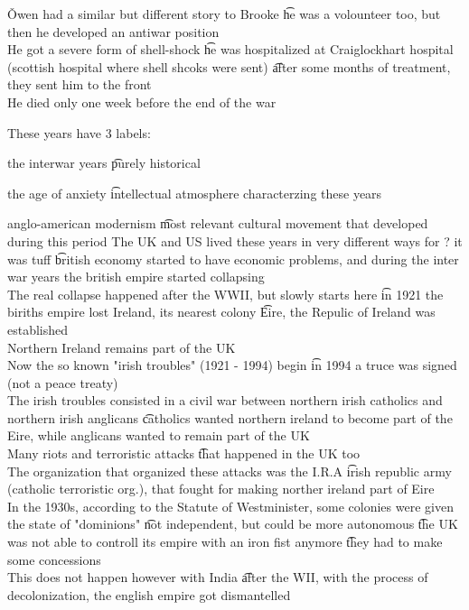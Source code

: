 \documentclass[12pt]{article}
\begin{document}
\v

Owen had a similar but different story to Brooke \t he was a volounteer too, but then he developed an antiwar position \\
He got a severe form of shell-shock \t he was hospitalized at Craiglockhart hospital (scottish hospital where shell shcoks were sent) \t after some months of treatment, they sent him to the front \\
He died only one week before the end of the war

\s[1920s - 1930s in England]
These years have 3 labels:
\bi
  \item the interwar years \t purely historical
  \item the age of anxiety \t intellectual atmosphere characterzing these years
  \item anglo-american modernism \t most relevant cultural movement that developed during this period
\ei
The UK and US lived these years in very different ways for ? it was tuff \t british economy started to have economic problems, and during the inter war years the british empire started collapsing \\
The real collapse happened after the WWII, but slowly starts here \t in 1921 the biriths empire lost Ireland, its nearest colony \t Eire, the Repulic of Ireland was established \\
Northern Ireland remains part of the UK \\
Now the so known "irish troubles" (1921 - 1994) begin \t in 1994 a truce was signed (not a peace treaty) \\
The irish troubles consisted in a civil war between northern irish catholics and northern irish anglicans \t catholics wanted northern ireland to become part of the Eire, while anglicans wanted to remain part of the UK \\
Many riots and terroristic attacks \t that happened in the UK too \\
The organization that organized these attacks was the I.R.A \t irish republic army (catholic terroristic org.), that fought for making norther ireland part of Eire \\
In the 1930s, according to the Statute of Westminister, some colonies were given the state of "dominions" \t not independent, but could be more autonomous \t the UK was not able to controll its empire with an iron fist anymore \t they had to make some concessions \\
This does not happen however with India \t after the WII, with the process of decolonization, the english empire got dismantelled 
\end{document}
